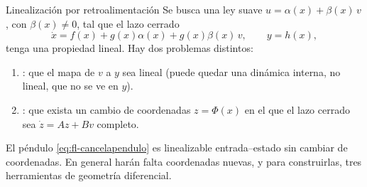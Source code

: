 \begin{definicion}[label=def:fl-problemas]{Linealización por retroalimentación}
Se busca una ley suave $u=\alpha(x)+\beta(x)\,v$, con $\beta(x)\neq0$, tal que el lazo cerrado
\[
  \dot x=f(x)+g(x)\alpha(x)+g(x)\beta(x)\,v,\qquad y=h(x),
\]
tenga una propiedad lineal. Hay dos problemas distintos:
\begin{enumerate}
  \item {}: que el mapa de $v$ a $y$ sea lineal (puede quedar una dinámica interna, no lineal, que no se ve en $y$).
  \item {}: que exista un cambio de coordenadas $z=\Phi(x)$ en el que el lazo cerrado sea $\dot z=Az+Bv$ completo.
\end{enumerate}
\end{definicion}

El péndulo \eqref{eq:fl-cancelapendulo} es linealizable entrada--estado sin cambiar de coordenadas. En general harán falta coordenadas nuevas, y para construirlas, tres herramientas de geometría diferencial.
